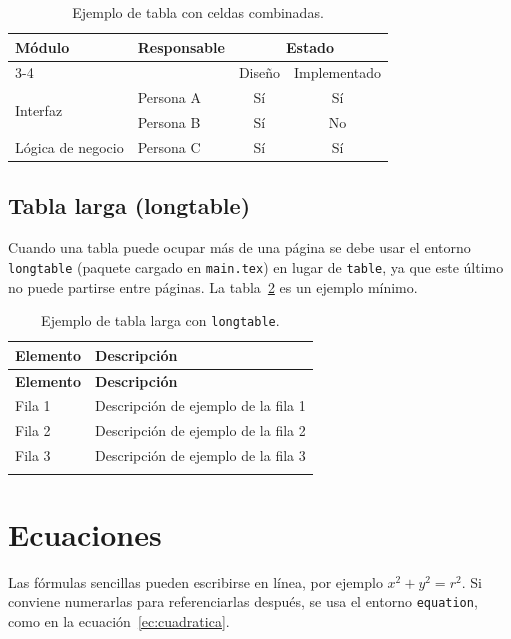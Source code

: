 \begin{table}[H]
  \centering
  \begin{tabular}{l l c c}
    \hline
    \multirow{2}{*}{\textbf{Módulo}} & \multirow{2}{*}{\textbf{Responsable}} & \multicolumn{2}{c}{\textbf{Estado}} \\
    \cline{3-4}
     & & Diseño & Implementado \\
    \hline
    \multirow{2}{*}{Interfaz} & Persona A & Sí & Sí \\
     & Persona B & Sí & No \\
    Lógica de negocio & Persona C & Sí & Sí \\
    \hline
  \end{tabular}
  \caption{Ejemplo de tabla con celdas combinadas.}
  \label{tab:multirow}
\end{table}

\subsection{Tabla larga (longtable)}

Cuando una tabla puede ocupar más de una página se debe usar el entorno \texttt{longtable} (paquete cargado en \texttt{main.tex}) en lugar de \texttt{table}, ya que este último no puede partirse entre páginas. La tabla~\ref{tab:longtable} es un ejemplo mínimo.

\begin{center}
\begin{longtable}{l l}
  \hline
  \textbf{Elemento} & \textbf{Descripción} \\
  \hline
  \endfirsthead
  \textbf{Elemento} & \textbf{Descripción} \\
  \hline
  \endhead
  Fila 1 & Descripción de ejemplo de la fila 1 \\
  Fila 2 & Descripción de ejemplo de la fila 2 \\
  Fila 3 & Descripción de ejemplo de la fila 3 \\
  \hline
  \caption{Ejemplo de tabla larga con \texttt{longtable}.}
  \label{tab:longtable}
\end{longtable}
\end{center}

\section{Ecuaciones}
\label{sec:ecuaciones}

Las fórmulas sencillas pueden escribirse en línea, por ejemplo $x^2 + y^2 = r^2$. Si conviene numerarlas para referenciarlas después, se usa el entorno \texttt{equation}, como en la ecuación~\eqref{ec:cuadratica}.

